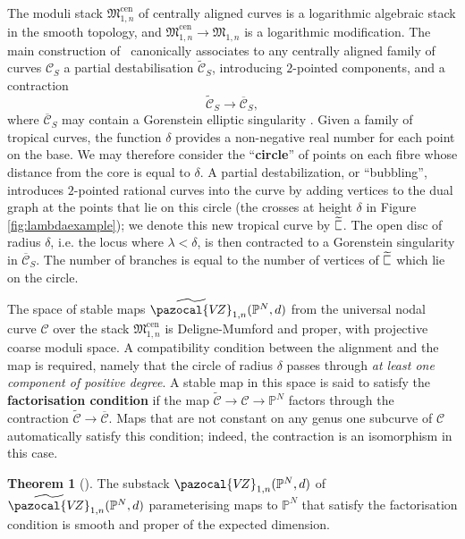 \documentclass[11pt]{amsart}
\newcommand{\plC}{\scalebox{0.8}[1.3]{$\sqsubset$}}
\newcommand{\sqC}{\scalebox{0.8}[1.3]{$\sqsubset$}}
\newcommand{\PP}{\mathbb P}
\newcommand{\VZ}{\pazocal{V\!Z}}
\renewcommand{\to}{\rightarrow}
\theoremstyle{definition}
\newtheorem{thm}{Theorem}[section]
\theoremstyle{definition}
\begin{document}
The moduli stack $\mathfrak M_{1,n}^{\mathrm{cen}}$  of centrally aligned curves is a logarithmic algebraic stack in the smooth topology, and $\mathfrak M_{1,n}^{\mathrm{cen}}\to\mathfrak M_{1,n}$ is a logarithmic modification. The main construction of~\cite{RSPW} canonically associates to any centrally aligned family of curves $\mathcal C_S$ a partial destabilisation $\widetilde{\mathcal C}_S$, introducing $2$-pointed components, and a contraction
\[
\widetilde{\mathcal C}_S\to \overline{\mathcal C}_S,
\]
where $\overline{\mathcal C}_S$ may contain a Gorenstein elliptic singularity \cite{SMY1}. Given a family of tropical curves, the function $\delta$ provides a non-negative real number for each point on the base. We may therefore consider the ``\textbf{circle}'' of points on each fibre whose distance from the core is equal to $\delta$. A partial destabilization, or ``bubbling'', introduces $2$-pointed rational curves into the curve by adding vertices to the dual graph at the points that lie on this circle (the crosses at height $\delta$ in Figure \ref{fig:lambdaexample}); we denote this new tropical curve by $\widetilde{\plC}$. The open disc of radius $\delta$, i.e. the locus where $\lambda<\delta$, is then contracted to a Gorenstein singularity in $\overline{\mathcal C}_S$. The number of branches is equal to the number of vertices of $\widetilde{\sqC}$ which lie on the circle. %

The space of stable maps $\widetilde\VZ_{1,n}(\PP^N,d)$ from the universal nodal curve $\mathcal C$ over the stack $\mathfrak M_{1,n}^{\mathrm{cen}}$ is Deligne-Mumford and proper, with projective coarse moduli space. A compatibility condition between the alignment and the map is required, namely that the circle of radius $\delta$ passes through \emph{at least one component of positive degree}. A stable map in this space is said to satisfy the \textbf{factorisation condition} if the map $\widetilde{\mathcal C}\to \mathcal C\to \mathbb P^N$ factors through the contraction $\widetilde{\mathcal C}\to \overline{\mathcal C}$. Maps that are not constant on any genus one subcurve of $\mathcal C$ automatically satisfy this condition; indeed, the contraction is an isomorphism in this case.
 
\begin{thm}[{\cite[Theorem B]{RSPW}}]
The substack $\VZ_{1,n}(\mathbb P^N,d)$ of $\widetilde\VZ_{1,n}(\PP^N,d)$ parameterising maps to $\mathbb P^N$ that satisfy the factorisation condition is smooth and proper of the expected dimension.
\end{thm}
\end{document}
